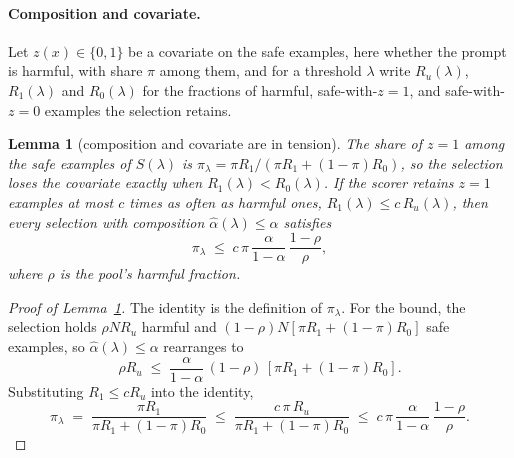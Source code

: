 \documentclass{article} %
\newtheorem{lemma}{Lemma}
\newcommand{\sel}[1]{S(#1)}
\newcommand{\ahat}{\hat\alpha}
\begin{document}
\paragraph{Composition and covariate.} Let $z(x) \in \{0, 1\}$ be a covariate on the safe examples, here whether the prompt is harmful, with share $\pi$ among them, and for a threshold $\lambda$ write $R_u(\lambda)$, $R_1(\lambda)$ and $R_0(\lambda)$ for the fractions of harmful, safe-with-$z = 1$, and safe-with-$z = 0$ examples the selection retains.
\begin{lemma}[composition and covariate are in tension]
\label{lem:tension}
The share of $z = 1$ among the safe examples of $\sel{\lambda}$ is $\pi_\lambda = \pi R_1 / (\pi R_1 + (1 - \pi) R_0)$, so the selection loses the covariate exactly when $R_1(\lambda) < R_0(\lambda)$. If the scorer retains $z = 1$ examples at most $c$ times as often as harmful ones, $R_1(\lambda) \le c\, R_u(\lambda)$, then every selection with composition $\ahat(\lambda) \le \alpha$ satisfies
\[
\pi_\lambda \;\le\; c\,\pi\,\frac{\alpha}{1-\alpha}\,\frac{1-\rho}{\rho},
\]
where $\rho$ is the pool's harmful fraction. 
\end{lemma}
\begin{proof}[Proof of Lemma~\ref{lem:tension}]
The identity is the definition of $\pi_\lambda$. For the bound, the selection holds $\rho N R_u$ harmful and $(1-\rho) N [\pi R_1 + (1-\pi) R_0]$ safe examples, so $\ahat(\lambda) \le \alpha$ rearranges to
\[
\rho R_u \;\le\; \frac{\alpha}{1-\alpha}\,(1-\rho)\,[\pi R_1 + (1-\pi) R_0].
\]
Substituting $R_1 \le c R_u$ into the identity,
\[
\pi_\lambda \;=\; \frac{\pi R_1}{\pi R_1 + (1-\pi) R_0} \;\le\; \frac{c\,\pi\, R_u}{\pi R_1 + (1-\pi) R_0} \;\le\; c\,\pi\,\frac{\alpha}{1-\alpha}\,\frac{1-\rho}{\rho}.
\]
\end{proof}
\end{document}
